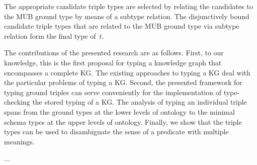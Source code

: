 \documentclass[runningheads]{llncs}
\begin{document}
The appropriate candidate triple types are selected by relating the
candidates to the MUB ground type by means of a subtype relation. The
disjunctively bound candidate triple types that are related to the MUB
ground type via subtype relation form the final type of~$t$.

The contributions of the presented research are as follows. First, to
our knowledge, this is the first proposal for typing a knowledge graph
that encompasses a complete KG. The existing approaches to typing a KG
deal with the particular problems of typing a KG. Second, the
presented framework for typing ground triples can serve conveniently
for the implementation of type-checking the stored typing of a KG. The
analysis of typing an individual triple spans from the ground types at
the lower levels of ontology to the minimal schema types at the upper
levels of ontology. Finally, we show that the triple types can be used
to disambiguate the sense of a predicate with multiple meanings.

...\\
\end{document}

